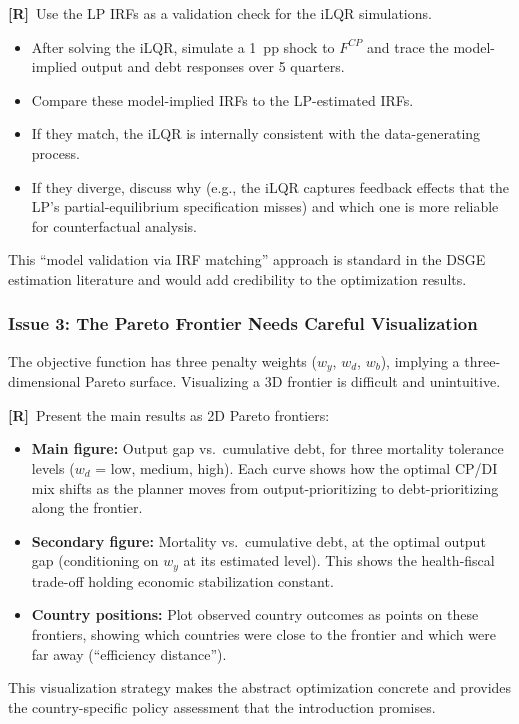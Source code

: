 \documentclass[12pt, a4paper]{article}
\newcommand{\recommend}[1]{\textcolor{recommend}{\textbf{[R]}~#1}}
\begin{document}
\recommend{Use the LP IRFs as a validation check for the iLQR simulations.}
\begin{itemize}
    \item After solving the iLQR, simulate a 1~pp shock to $F^{CP}$ and trace the model-implied output and debt responses over 5 quarters.
    \item Compare these model-implied IRFs to the LP-estimated IRFs.
    \item If they match, the iLQR is internally consistent with the data-generating process.
    \item If they diverge, discuss why (e.g., the iLQR captures feedback effects that the LP's partial-equilibrium specification misses) and which one is more reliable for counterfactual analysis.
\end{itemize}
This ``model validation via IRF matching'' approach is standard in the DSGE estimation literature \citep{christiano2005} and would add credibility to the optimization results.


\subsubsection*{Issue 3: The Pareto Frontier Needs Careful Visualization}

The objective function has three penalty weights ($w_y$, $w_d$, $w_b$), implying a three-dimensional Pareto surface. Visualizing a 3D frontier is difficult and unintuitive.

\recommend{Present the main results as 2D Pareto frontiers:}
\begin{itemize}
    \item \textbf{Main figure:} Output gap vs.\ cumulative debt, for three mortality tolerance levels ($w_d$ = low, medium, high). Each curve shows how the optimal CP/DI mix shifts as the planner moves from output-prioritizing to debt-prioritizing along the frontier.
    \item \textbf{Secondary figure:} Mortality vs.\ cumulative debt, at the optimal output gap (conditioning on $w_y$ at its estimated level). This shows the health-fiscal trade-off holding economic stabilization constant.
    \item \textbf{Country positions:} Plot observed country outcomes as points on these frontiers, showing which countries were close to the frontier and which were far away (``efficiency distance'').
\end{itemize}
This visualization strategy makes the abstract optimization concrete and provides the country-specific policy assessment that the introduction promises.
\end{document}
